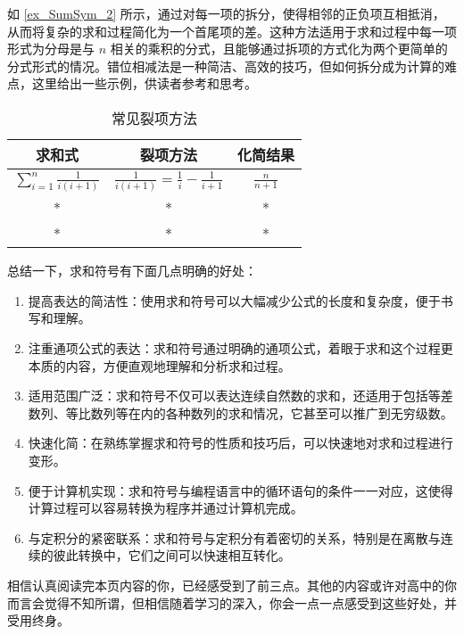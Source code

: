 如 \autoref{ex_SumSym_2} 所示，通过对每一项的拆分，使得相邻的正负项互相抵消，从而将复杂的求和过程简化为一个首尾项的差。这种方法适用于求和过程中每一项形式为分母是与 $n$ 相关的乘积的分式，且能够通过拆项的方式化为两个更简单的分式形式的情况。错位相减法是一种简洁、高效的技巧，但如何拆分成为计算的难点，这里给出一些示例，供读者参考和思考。
\begin{table}[ht]
\centering
\caption{常见裂项方法}\label{tab_SumSym1}
\begin{tabular}{|c|c|c|}
\hline
求和式 & 裂项方法 & 化简结果 \\
\hline
$\displaystyle\sum\limits_{i=1}^n \frac{1}{i(i+1)}$ & $\displaystyle\frac{1}{i(i+1)}=\frac{1}{i}-\frac{1}{i+1}$ & $\displaystyle\frac{n}{n+1}$ \\
\hline
* & * & * \\
\hline
* & * & * \\
\hline
\end{tabular}
\end{table}
总结一下，求和符号有下面几点明确的好处：

\begin{enumerate}
\item 提高表达的简洁性：使用求和符号可以大幅减少公式的长度和复杂度，便于书写和理解。
\item 注重通项公式的表达：求和符号通过明确的通项公式，着眼于求和这个过程更本质的内容，方便直观地理解和分析求和过程。
\item 适用范围广泛：求和符号不仅可以表达连续自然数的求和，还适用于包括等差数列、等比数列等在内的各种数列的求和情况，它甚至可以推广到无穷级数。
\item 快速化简：在熟练掌握求和符号的性质和技巧后，可以快速地对求和过程进行变形。
\item 便于计算机实现：求和符号与编程语言中的循环语句的条件一一对应，这使得计算过程可以容易转换为程序并通过计算机完成。
\item 与定积分的紧密联系：求和符号与定积分有着密切的关系，特别是在离散与连续的彼此转换中，它们之间可以快速相互转化。
\end{enumerate}

相信认真阅读完本页内容的你，已经感受到了前三点。其他的内容或许对高中的你而言会觉得不知所谓，但相信随着学习的深入，你会一点一点感受到这些好处，并受用终身。